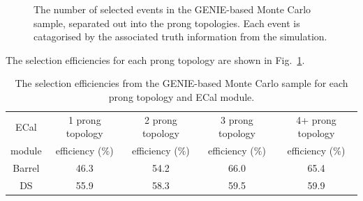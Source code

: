 \begin{figure}
  \centering
  \caption{The number of selected events in the GENIE-based Monte Carlo sample, separated out into the prong topologies.  Each event is catagorised by the associated truth information from the simulation.}
  \label{fig:ProngStackSelectedGENIE}
\end{figure}
The selection efficiencies for each prong topology are shown in Fig.~\ref{table:SelEfficiencyGENIE}.
\begin{table}
  \begin{tabular}{ c c c c c }
    ECal & 1 prong topology & 2 prong topology & 3 prong topology & 4+ prong topology \\
    module & efficiency ($\%$)& efficiency ($\%$)& efficiency ($\%$)& efficiency ($\%$) \\ \hline \hline
    Barrel & 46.3 & 54.2 & 66.0 & 65.4 \\
    DS & 55.9 & 58.3 & 59.5 & 59.9\\
  \end{tabular}
  \caption{The selection efficiencies from the GENIE-based Monte Carlo sample for each prong topology and ECal module.}
  \label{table:SelEfficiencyGENIE}
\end{table}
